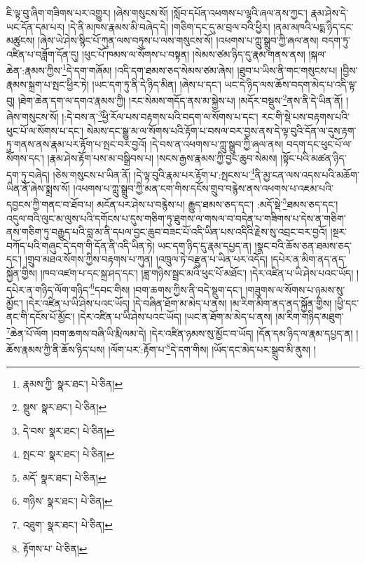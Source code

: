 ཇི་ལྟ་བུ་ཞིག་གཟིགས་པར་འགྱུར། །ཞེས་གསུངས་སོ། །སློབ་དཔོན་འཕགས་པ་ལྷའི་ཞལ་ནས་ཀྱང་། རྣམ་ཤེས་དེ་ཡང་དོན་དམ་པར། །དེ་ནི་མཁས་རྣམས་མི་བཞེད་དེ། །གཅིག་དང་དུ་མ་བྲལ་བའི་ཕྱིར། །ནམ་མཁའི་པདྨ་ཉིད་དང་མཚུངས། །ཞེས་ཡེ་ཤེས་སྙིང་པོ་ཀུན་ལས་བཏུས་པ་ལས་གསུངས་སོ། །འཕགས་པ་ཀླུ་སྒྲུབ་ཀྱི་ཞལ་ནས། བདག་ཏུ་འཛིན་པ་བཟློག་དོན་དུ། །ཕུང་པོ་ཁམས་ལ་སོགས་པ་བསྟན། །སེམས་ཙམ་ཉིད་དུ་རྣམ་གནས་ནས། །སྐལ་ཆེན་:རྣམས་ཀྱིས་\footnote{རྣམས་ཀྱི་  སྣར་ཐང་།  པེ་ཅིན། }དེ་དག་གཞོམ། །འདི་དག་ཐམས་ཅད་སེམས་ཙམ་ཞེས། །ཐུབ་པ་ཡིས་ནི་གང་གསུངས་པ། །བྱིས་རྣམས་སྐྲག་པ་སྤང་ཕྱིར་ཏེ། །ཡང་དག་ཏུ་ནི་དེ་ཉིད་མིན། །ཞེས་པ་དང་། ཡང་དེ་ཉིད་ལས་ཆོས་བདག་མེད་པ་འདི་ལྟ་བུ། །ཐེག་ཆེན་དག་ལ་དགའ་རྣམས་ཀྱི། །རང་སེམས་གདོད་ནས་མ་སྐྱེས་པ། །མདོར་བསྡུས་\footnote{སྡུས་  སྣར་ཐང་།  པེ་ཅིན། }ནས་ནི་དེ་ཡིན་ནོ། །ཞེས་གསུངས་སོ། །:དེ་བས་ན་\footnote{དེ་བས་  སྣར་ཐང་།  པེ་ཅིན། }ཕྱི་རོལ་པས་བརྟགས་པའི་བདག་ལ་སོགས་པ་དང་། རང་གི་སྡེ་པས་བརྟགས་པའི་ཕུང་པོ་ལ་སོགས་པ་དང་། སེམས་དང་སྒྱུ་མ་ལ་སོགས་པའི་རྟོག་པ་བསལ་བར་བྱས་ནས་དེ་ལྟ་བུའི་དོན་ལ་དུས་རྟག་ཏུ་གནས་ནས་རྣམ་པར་རྟོག་པ་སྤང་བར་བྱའོ། །དེ་བས་ན་འཕགས་པ་ཀླུ་སྒྲུབ་ཀྱི་ཞལ་ནས། བདག་དང་ཕུང་པོ་ལ་སོགས་དང་། །རྣམ་ཤེས་རྟོག་པས་མ་བསྒྲིབས་པ། །སངས་རྒྱས་རྣམས་ཀྱི་བྱང་ཆུབ་སེམས། །སྟོང་པའི་མཚན་ཉིད་དག་ཏུ་བཞེད། །ཅེས་གསུངས་པ་ཡིན་ནོ། །དེ་ལྟ་བུའི་རྣམ་པར་རྟོག་པ་:སྤངས་པ་\footnote{སྤང་བ་  སྣར་ཐང་།  པེ་ཅིན། }ནི་མྱ་ངན་ལས་འདས་པའི་མཆོག་ཡིན་ནོ་ཞེས་སྨྲས་སོ། །འཕགས་པ་ཀླུ་སྒྲུབ་ཀྱི་མན་ངག་གིས་དངོས་གྲུབ་བརྙེས་ནས་འཕགས་པ་འཇམ་པའི་དབྱངས་ཀྱི་གནང་བ་ཐོབ་པ། མངོན་པར་ཤེས་པ་བརྙེས་པ། རྒྱུད་ཐམས་ཅད་དང་། :མདོ་སྡེ་\footnote{མདོ་  སྣར་ཐང་།  པེ་ཅིན། }ཐམས་ཅད་དང་། འདུལ་བའི་ལུང་མ་ལུས་པའི་དགོངས་པ་དུས་གཅིག་ཏུ་ཐུགས་ལ་གསལ་བ་བདེན་པ་གཟིགས་པ་དེས་ན་གཅིག་ནས་གཅིག་ཏུ་བརྒྱུད་པའི་བླ་མ་ནི་དཔལ་བྱང་ཆུབ་བཟང་པོ་འདི་ཡིན་པས་འདིའི་རྗེས་སུ་འབྲང་བར་བྱའོ། །སྔར་བཀོད་པའི་གཞུང་དེ་དག་གི་དོན་ནི་འདི་ཡིན་ཏེ། ཡང་དག་ཉིད་དུ་རྣམ་དཔྱད་ན། །སྣང་བའི་ཆོས་ཅན་ཐམས་ཅད་དང་། །གྲུབ་མཐའ་སོགས་ཀྱིས་བརྟགས་པ་ཀུན། །འཁྲུལ་ཏེ་བརྫུན་པ་ཡིན་པར་འདོད། །དཔེར་ན་མིག་ནད་ནད་སྐྱོན་གྱིས། །ཁབ་འཛག་པ་དང་སྐྲ་ཤད་དང་། །ཟླ་གཉིས་སྦྲང་མའི་ཕུང་པོ་མཐོང་། །དེར་འཛིན་པ་ཡི་ཤེས་པའང་ཡོད། །དཔེར་ན་གཉིད་ལོག་གཉིད་\footnote{གཉིས་  སྣར་ཐང་།  པེ་ཅིན། }དབང་གིས། །བག་ཆགས་ཀྱིས་ནི་བདེ་སྡུག་དང་། །གཟུགས་ལ་སོགས་པ་ཉམས་སུ་མྱོང་། །དེར་འཛིན་པ་ཡི་ཤེས་པའང་ཡོད། །དེ་བཞིན་ཐོག་མ་མེད་པ་ནས། །མ་རིག་མིག་ནད་ནད་སྐྱོན་གྱིས། །ཕྱི་དང་ནང་གི་དངོས་པོ་མྱོང་། །དེར་འཛིན་པ་ཡི་ཤེས་པའང་ཡོད། །ཡང་ན་ཐོག་མ་མེད་པ་ནས། །མ་རིག་གཉིད་མཐུག་\footnote{འཐུག་  སྣར་ཐང་།  པེ་ཅིན། }ཆེན་པོ་ལོག །བག་ཆགས་བཞི་ཡི་རྨི་ལམ་དེ། །དེར་འཛིན་ཉམས་སུ་མྱོང་བ་ཡོད། །དོན་དམ་ཉིད་ལ་རྣམ་དཔྱད་ན། །ཆོས་རྣམས་ཀྱི་ནི་ཆོས་ཉིད་པས། །ལོག་པར་:རྟོག་པ་\footnote{རྟོགས་པ་  པེ་ཅིན། }དེ་དག་གིས། །ཡོད་དང་མེད་པར་སྒྲུབ་མི་ནུས། །

